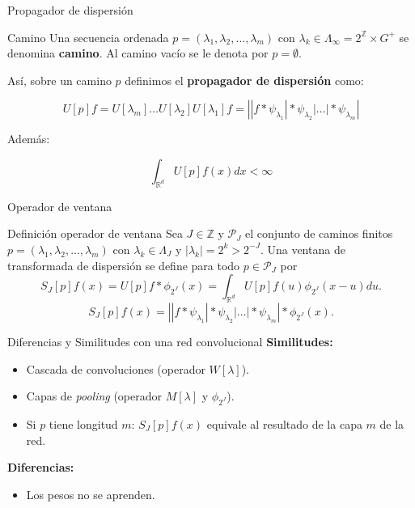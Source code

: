 \documentclass[aspectratio=43]{beamer}
\begin{document}
\begin{frame}{Propagador de dispersión}

  \begin{block}{Camino}
    Una secuencia ordenada $p=(\lambda_1,\lambda_2, \ldots , \lambda_m)$ con $\lambda_k \in \Lambda_\infty=2^{\mathbb{Z}} \times G^{+} $ se denomina \textbf{camino}. Al camino vacío se le denota por $p=\emptyset$.
  \end{block}

  Así, sobre un camino $p$ definimos el \textbf{propagador de dispersión} como:

  $$  U[p]f=U[\lambda_m] \ldots U[\lambda_2]U[\lambda_1]f=\left| |f \ast \psi_{\lambda_1} | \ast \psi_{\lambda_2} | \ldots | \ast \psi_{\lambda_m} \right|
  $$

  \medskip

  Además:

  $$ \int_{\mathbb{R}^d} U[p]f(x)dx < \infty $$
\end{frame}

\begin{frame}{Operador de ventana}
  \begin{block}{Definición operador de ventana}
    Sea $J \in \mathbb{Z}$ y $\mathcal{P}_J$ el conjunto de caminos finitos $p=(\lambda_1,\lambda_2,...,\lambda_m)$ con $\lambda_k \in \Lambda_J$ y $|\lambda_k|=2^{k}>2^{-J}$. Una ventana de transformada de dispersión se define para todo $p \in \mathcal{P}_J$ por
    \begin{equation*}
      S_J[p]f(x)=U[p]f \ast \phi_{2^J}(x)=\int_{\mathbb{R}^d}U[p]f(u)\phi_{2^J}(x-u)du.
    \end{equation*}
    \begin{equation*}
      S_J[p]f(x)=\left| |f \ast \psi_{\lambda_1} | \ast \psi_{\lambda_2} | \ldots | \ast \psi_{\lambda_m} \right| \ast \phi_{2^J}(x).
    \end{equation*}
  \end{block}
\end{frame}

\begin{frame}{Diferencias y Similitudes con una red convolucional}
  \textbf{\textcolor{tudCyan}{Similitudes:}}
  \begin{itemize}
    \item Cascada de convoluciones (operador $W[\lambda]$).
    \item Capas de \textit{pooling} (operador $M[\lambda]$ y $\phi_{2^J}$).
    \item Si $p$ tiene longitud $m$: $S_J[p]f(x)$ equivale al resultado de la capa $m$ de la red.
  \end{itemize}

  \textbf{\textcolor{tudCyan}{Diferencias:}}
  \begin{itemize}
    \item Los pesos no se aprenden.
  \end{itemize}
\end{frame}
\end{document}
